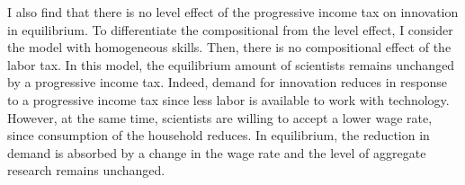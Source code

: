  I also find that there is no level effect of the progressive income tax on innovation in equilibrium. To differentiate the compositional from the level effect, I consider the model with homogeneous skills. Then, there is no compositional effect of the labor tax. In this model, the equilibrium amount of scientists remains unchanged by a progressive income tax. Indeed, demand for innovation reduces in response to a progressive income tax since less labor is available to work with technology. However, at the same time, scientists are willing to accept a lower wage rate, since consumption of the household reduces. In equilibrium, the reduction in demand is absorbed by a change in the wage rate and the level of aggregate research remains unchanged. 

